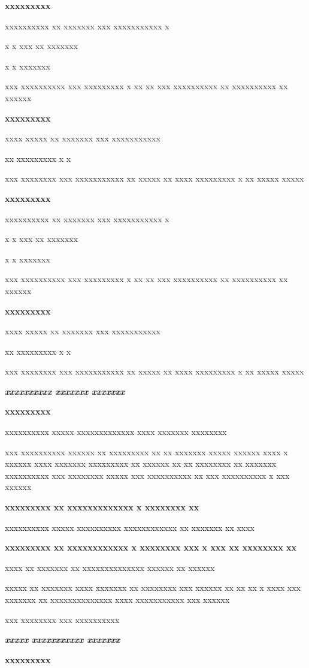 \documentclass[11pt,a4paper]{article}
\begin{document}
\textbf{xxxxxxxxx}

xxxxxxxxxx xx xxxxxxx xxx xxxxxxxxxxx x

x x xxx xx xxxxxxx

x x xxxxxxx

xxx xxxxxxxxxx xxx xxxxxxxxx x xx xx xxx xxxxxxxxxx xx xxxxxxxxxx xx xxxxxx

\textbf{xxxxxxxxx}

xxxx xxxxx xx xxxxxxx xxx xxxxxxxxxxx

xx xxxxxxxxx x x

xxx xxxxxxxx xxx xxxxxxxxxxx xx xxxxx xx xxxx xxxxxxxxx x xx xxxxx xxxxx

\textbf{xxxxxxxxx}

xxxxxxxxxx xx xxxxxxx xxx xxxxxxxxxxx x

x x xxx xx xxxxxxx

x x xxxxxxx

xxx xxxxxxxxxx xxx xxxxxxxxx x xx xx xxx xxxxxxxxxx xx xxxxxxxxxx xx xxxxxx

\textbf{xxxxxxxxx}

xxxx xxxxx xx xxxxxxx xxx xxxxxxxxxxx

xx xxxxxxxxx x x

xxx xxxxxxxx xxx xxxxxxxxxxx xx xxxxx xx xxxx xxxxxxxxx x xx xxxxx xxxxx

\textit{\textbf{xxxxxxxxxx xxxxxxx xxxxxxx}}

\textbf{xxxxxxxxx}

xxxxxxxxxx xxxxx xxxxxxxxxxxxx xxxx xxxxxxx xxxxxxxx

xxx xxxxxxxxxx xxxxxx xx xxxxxxxxx xx xx xxxxxxx xxxxx xxxxxx xxxx x xxxxxx xxxx xxxxxxx xxxxxxxxx xx xxxxxx xx xx xxxxxxxx xx xxxxxxx xxxxxxxxxx xxx xxxxxxxx xxxxx xxx xxxxxxxxxx xx xxx xxxxxxxxxx x xxx xxxxxx

\textbf{xxxxxxxxx	xx xxxxxxxxxxxxx x xxxxxxxx xx}

xxxxxxxxxx xxxxx xxxxxxxxxx xxxxxxxxxxxx xx xxxxxxx xx xxxx

\textbf{xxxxxxxxx	xx xxxxxxxxxxxx x xxxxxxxx xxx x xxx xx xxxxxxxx xx}

xxxx xx xxxxxxx xx xxxxxxxxxxxxxx xxxxxx xx xxxxxx

xxxxx xx xxxxxxx xxxx xxxxxxx xx xxxxxxxx xxx xxxxxx xx xx xx x xxxx xxx xxxxxxx xx xxxxxxxxxxxxxx xxxx xxxxxxxxxxx xxx xxxxxx

xxx xxxxxxxx xxx xxxxxxxxxx

\textit{\textbf{xxxxx xxxxxxxxxxx xxxxxxx}}

\textbf{xxxxxxxxx}
\end{document}
